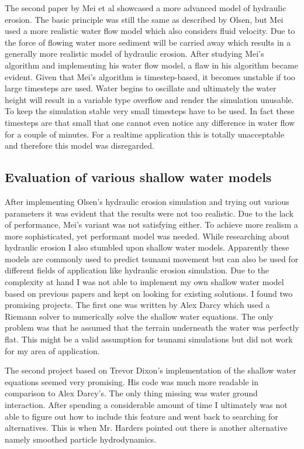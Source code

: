 \documentclass[11pt,a4paper,twoside,openright]{report}
\begin{document}
The second paper \cite{mei:inria-00402079} by Mei et al showcased a more advanced model of hydraulic erosion. The basic principle was still the same as described by Olsen, but Mei used a more realistic water flow model which also considers fluid velocity. Due to the force of flowing water more sediment will be carried away which results in a generally more realistic model of hydraulic erosion. After studying Mei's algorithm and implementing his water flow model, a flaw in his algorithm became evident. Given that Mei's algorithm is timestep-based, it becomes unstable if too large timesteps are used. Water begins to oscillate and ultimately the water height will result in a variable type overflow and render the simulation unusable. To keep the simulation stable very small timesteps have to be used. In fact these timesteps are that small that one cannot even notice any difference in water flow for a couple of minutes. For a realtime application this is totally unacceptable and therefore this model was disregarded.

\subsection{Evaluation of various shallow water models}
After implementing Olsen's hydraulic erosion simulation and trying out various parameters it was evident that the results were not too realistic. Due to the lack of performance, Mei's variant was not satisfying either. To achieve more realism a more sophisticated, yet performant model was needed. While researching about hydraulic erosion I also stumbled upon shallow water models. Apparently these models are commonly used to predict tsunami movement but can also be used for different fields of application like hydraulic erosion simulation. Due to the complexity at hand I was not able to implement my own shallow water model based on previous papers and kept on looking for existing solutions. I found two promising projects. The first one was written by Alex Darcy which used a Riemann solver to numerically solve the shallow water equations. The only problem was that he assumed that the terrain underneath the water was perfectly flat. This might be a valid assumption for tsunami simulations but did not work for my area of application.

The second project based on Trevor Dixon's implementation of the shallow water equations seemed very promising. His code was much more readable in comparison to Alex Darcy's. The only thing missing was water ground interaction. After spending a considerable amount of time I ultimately was not able to figure out how to include this feature and went back to searching for alternatives. This is when Mr. Harders pointed out there is another alternative namely smoothed particle hydrodynamics.
\end{document}
